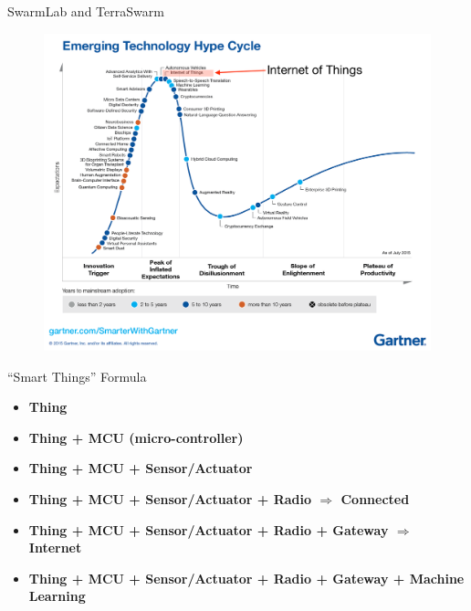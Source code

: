 \begin{frame}{SwarmLab and TerraSwarm}

\end{frame}

\begin{frame}
  \begin{figure}
    \includegraphics[width=\textwidth]{figures/hype.png}
  \end{figure}
\end{frame}

\begin{frame}{``Smart Things'' Formula}

  \begin{itemize}
  \item<1-> \textbf<1>{Thing}
  \item<2-> \textbf<2>{Thing + MCU (micro-controller)}
  \item<3-> \textbf<3>{Thing + MCU + Sensor/Actuator}
  \item<4-> \textbf<4>{Thing + MCU + Sensor/Actuator + Radio $\Rightarrow$ Connected}
  \item<5-> \textbf<5>{Thing + MCU + Sensor/Actuator + Radio + Gateway $\Rightarrow$ Internet}
  \item<5-> \textbf<6>{Thing + MCU + Sensor/Actuator + Radio + Gateway + Machine Learning}
  \end{itemize}

\end{frame}


